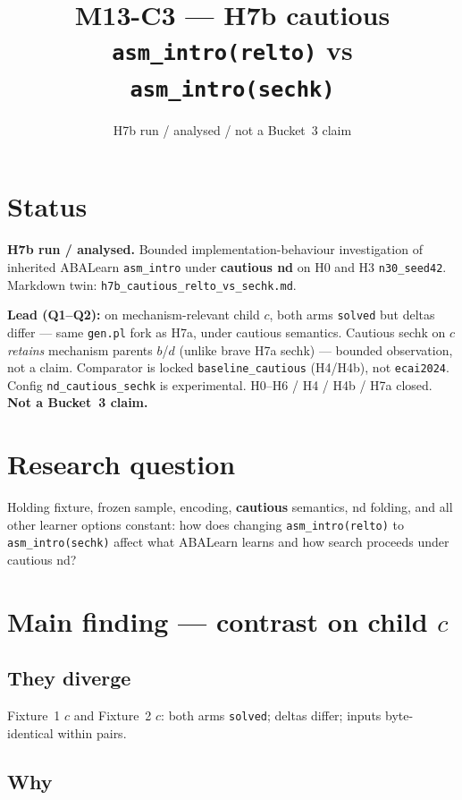 \documentclass[11pt]{article}
\title{M13-C3 --- H7b cautious \texttt{asm\_intro(relto)} vs
\texttt{asm\_intro(sechk)}}
\author{}
\date{H7b run / analysed / not a Bucket~3 claim}
\begin{document}
\maketitle

\section{Status}

\textbf{H7b run / analysed.}
Bounded implementation-behaviour investigation of inherited ABALearn
\texttt{asm\_intro} under \textbf{cautious nd} on H0 and H3
\texttt{n30\_seed42}.
Markdown twin: \texttt{h7b\_cautious\_relto\_vs\_sechk.md}.

\textbf{Lead (Q1--Q2):} on mechanism-relevant child $c$, both arms
\texttt{solved} but deltas differ --- same \texttt{gen.pl} fork as H7a, under
cautious semantics.
Cautious sechk on $c$ \emph{retains} mechanism parents $b$/$d$ (unlike brave
H7a sechk) --- bounded observation, not a claim.
Comparator is locked \texttt{baseline\_cautious} (H4/H4b), not
\texttt{ecai2024}.
Config \texttt{nd\_cautious\_sechk} is experimental.
H0--H6 / H4 / H4b / H7a closed.
\textbf{Not a Bucket~3 claim.}

\section{Research question}

Holding fixture, frozen sample, encoding, \textbf{cautious} semantics, nd
folding, and all other learner options constant: how does changing
\texttt{asm\_intro(relto)} to \texttt{asm\_intro(sechk)} affect what ABALearn
learns and how search proceeds under cautious nd?

\section{Main finding --- contrast on child $c$}

\subsection{They diverge}

Fixture~1 $c$ and Fixture~2 $c$: both arms \texttt{solved}; deltas differ;
inputs byte-identical within pairs.

\subsection{Why}
\end{document}
